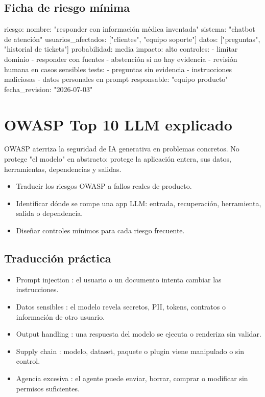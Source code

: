 \documentclass[11pt,a4paper]{book}
\begin{document}
\section{Ficha de riesgo mínima}
\begin{codebox}
riesgo:
  nombre: "responder con información médica inventada"
  sistema: "chatbot de atención"
  usuarios_afectados: ["clientes", "equipo soporte"]
  datos: ["preguntas", "historial de tickets"]
  probabilidad: media
  impacto: alto
  controles:
    - limitar dominio
    - responder con fuentes
    - abstención si no hay evidencia
    - revisión humana en casos sensibles
  tests:
    - preguntas sin evidencia
    - instrucciones maliciosas
    - datos personales en prompt
  responsable: "equipo producto"
  fecha_revision: "2026-07-03"
\end{codebox}
\chapter{OWASP Top 10 LLM explicado}
OWASP aterriza la seguridad de IA generativa en problemas concretos. No protege "el modelo" en abstracto: protege la aplicación entera, sus datos, herramientas, dependencias y salidas.

\begin{itemize}\item Traducir los riesgos OWASP a fallos reales de producto.\end{itemize}
\begin{itemize}\item Identificar dónde se rompe una app LLM: entrada, recuperación, herramienta, salida o dependencia.\end{itemize}
\begin{itemize}\item Diseñar controles mínimos para cada riesgo frecuente.\end{itemize}
\section{Traducción práctica}
\begin{itemize}\item Prompt injection : el usuario o un documento intenta cambiar las instrucciones.\end{itemize}
\begin{itemize}\item Datos sensibles : el modelo revela secretos, PII, tokens, contratos o información de otro usuario.\end{itemize}
\begin{itemize}\item Output handling : una respuesta del modelo se ejecuta o renderiza sin validar.\end{itemize}
\begin{itemize}\item Supply chain : modelo, dataset, paquete o plugin viene manipulado o sin control.\end{itemize}
\begin{itemize}\item Agencia excesiva : el agente puede enviar, borrar, comprar o modificar sin permisos suficientes.\end{itemize}
\end{document}

